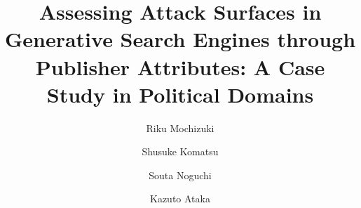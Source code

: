 \title[Assessing Attack Surfaces in Generative Search Engines]{Assessing Attack Surfaces in Generative Search Engines through Publisher Attributes: A Case Study in Political Domains}

\author{Riku Mochizuki}

\author{Shusuke Komatsu}

\author{Souta Noguchi}

\author{Kazuto Ataka}
